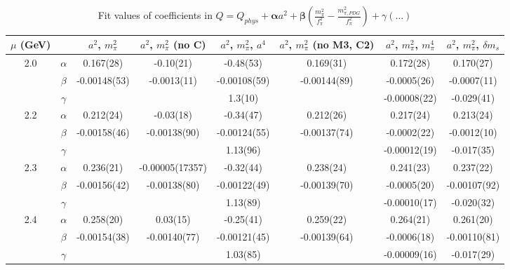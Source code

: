 \documentclass[12pt]{extarticle}
\begin{document}
\begin{table}[h!]
\begin{center}
\begin{tabular}{|c c|c|c|c|c|c|c|}
\hline
$\mu$ (GeV) &  & $a^2$, $m_\pi^2$& $a^2$, $m_\pi^2$ (no C)& $a^2$, $m_\pi^2$, $a^4$& $a^2$, $m_\pi^2$ (no M3, C2)& $a^2$, $m_\pi^2$, $m_\pi^4$& $a^2$, $m_\pi^2$, $\delta m_s$\\
\hline
\multirow{3}{0.5in}{2.0} & $\alpha$ & 0.167(28)& -0.10(21)& -0.48(53)& 0.169(31)& 0.172(28)& 0.170(27)\\
 & $\beta$ & -0.00148(53)& -0.0013(11)& -0.00108(59)& -0.00144(89)& -0.0005(26)& -0.0007(11)\\
 & $\gamma$ &  &  & 1.3(10)&  & -0.00008(22)& -0.029(41)\\
\hline
\multirow{3}{0.5in}{2.2} & $\alpha$ & 0.212(24)& -0.03(18)& -0.34(47)& 0.212(26)& 0.217(24)& 0.213(24)\\
 & $\beta$ & -0.00158(46)& -0.00138(90)& -0.00124(55)& -0.00137(74)& -0.0002(22)& -0.0012(10)\\
 & $\gamma$ &  &  & 1.13(96)&  & -0.00012(19)& -0.017(35)\\
\hline
\multirow{3}{0.5in}{2.3} & $\alpha$ & 0.236(21)& -0.00005(17357)& -0.32(44)& 0.238(24)& 0.241(23)& 0.237(22)\\
 & $\beta$ & -0.00156(42)& -0.00138(80)& -0.00122(49)& -0.00139(70)& -0.0005(20)& -0.00107(92)\\
 & $\gamma$ &  &  & 1.13(89)&  & -0.00010(17)& -0.020(32)\\
\hline
\multirow{3}{0.5in}{2.4} & $\alpha$ & 0.258(20)& 0.03(15)& -0.25(41)& 0.259(22)& 0.264(21)& 0.261(20)\\
 & $\beta$ & -0.00154(38)& -0.00140(77)& -0.00121(45)& -0.00139(64)& -0.0006(18)& -0.00110(81)\\
 & $\gamma$ &  &  & 1.03(85)&  & -0.00009(16)& -0.017(29)\\
\hline
\end{tabular}
\caption{Fit values of coefficients in $Q = Q_{phys} + \mathbf{\alpha} a^2 + \mathbf{\beta}\left(\frac{m_\pi^2}{f_\pi^2}-\frac{m_{\pi,PDG}^2}{f_\pi^2}\right) + \gamma(\ldots)$}
\end{center}
\end{table}






\end{document}
